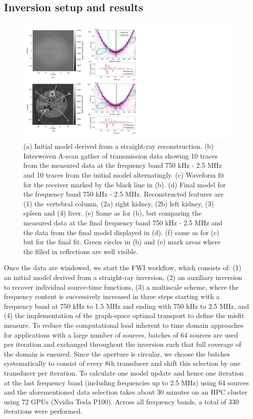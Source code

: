 \documentclass[12pt]{iopart}
\begin{document}
\subsection{Inversion setup and results}
\label{subsec:InversionandResults}
\begin{figure}[!h]
  \centering
  \includegraphics[width=\textwidth]{figure3.pdf}
  \caption{(a) Initial model derived from a straight-ray reconstruction. (b) Interwoven A-scan gather of transmission data showing 10 traces from the measured data at the frequency band 750 kHz - 2.5 MHz and 10 traces from the initial model alternatingly. (c) Waveform fit for the receiver marked by the black line in (b). (d) Final model for the frequency band 750 kHz - 2.5 MHz. Reconstructed features are (1) the vertebral column, (2a) right kidney, (2b) left kidney, (3) spleen and (4) liver. (e) Same as for (b), but comparing the measured data at the final frequency band 750 kHz - 2.5 MHz and the data from the final model displayed in (d). (f) same as for (c) but for the final fit. Green circles in (b) and (e) mark areas where the filled in reflections are well visible.}
  \label{fig:recons_and_repaired_shotgather}
\end{figure}
Once the data are windowed, we start the FWI workflow, which consists of: (1) an initial model derived from a straight-ray inversion, (2) an auxiliary inversion to recover individual source-time functions, (3) a multiscale scheme, where the frequency content is successively increased in three steps starting with a frequency band at 750 kHz to 1.5 MHz and ending with 750 kHz to 2.5 MHz, and (4) the implementation of the graph-space optimal transport to define the misfit measure. To reduce the computational load inherent to time domain approaches for applications with a large number of sources, batches of 64 sources are used per iteration and exchanged throughout the inversion such that full coverage of the domain is ensured. Since the aperture is circular, we choose the batches systematically to consist of every 8th transducer and shift this selection by one transducer per iteration. To calculate one model update and hence one iteration at the last frequency band (including frequencies up to 2.5 MHz) using 64 sources and the aforementioned data selection takes about 30 minutes on an HPC cluster using 72 GPUs (Nvidia Tesla P100). Across all frequency bands, a total of 330 iterations were performed. 
\end{document}
